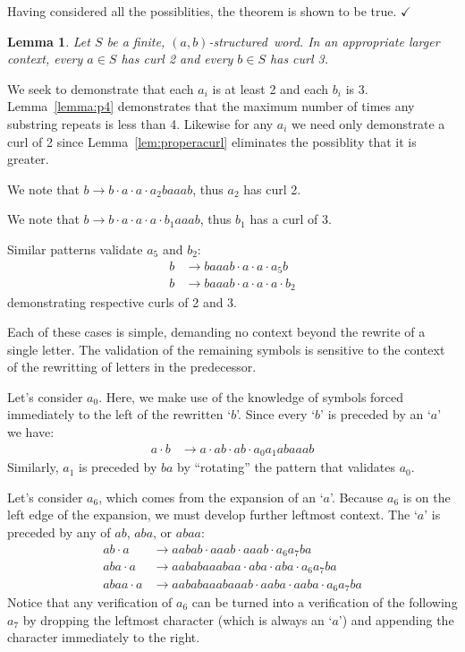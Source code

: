 \documentclass[11pt]{article}
\newcounter{thm}
\newtheorem{lemma}[thm]{Lemma}
\def\QED{$\checkmark$}
\def\ni{\noindent}
\def\ab{$(a,b)$}
\def\abs{\ab-structured}
\def\q#1{`$#1$'}
\def\Proof{\ni{\bf Proof:} }
\begin{document}
Having considered all the possiblities, the theorem is shown to be true.
\QED


\begin{lemma}\label{lem:abcurl}
Let $S$ be a finite, \abs\ word.  In an appropriate larger context, every $a\in S$ has curl 2 and every $b\in S$ has curl 3.
\end{lemma}
\Proof We seek to demonstrate that each $a_i$ is at least 2 and each $b_i$ is 3.
Lemma~\ref{lemma:p4} demonstrates that the maximum number of times any substring
repeats is less than 4.  Likewise for any $a_i$ we need only demonstrate a curl
of 2 since Lemma~\ref{lem:properacurl} eliminates the possiblity that it is greater.

\ni {Case $a_2$.} We note that $b\rightarrow b\cdot a\cdot a\cdot a_2baaab$, thus $a_2$ has curl 2.

\ni{Case $b_1$.}  We note that $b\rightarrow b\cdot a\cdot a\cdot a\cdot b_1aaab$, thus $b_1$ has a curl of 3.

\ni{Case $a_5$.} Similar patterns validate $a_5$ and $b_2$:
\begin{align*}
b&\rightarrow baaab\cdot a \cdot a \cdot a_5b\\
b&\rightarrow baaab\cdot a \cdot a \cdot a\cdot b_2
\end{align*}
\ni demonstrating respective curls of 2 and 3.

\ni Each of these cases is simple, demanding no context beyond the rewrite of a single letter. The validation of the remaining symbols is sensitive to the context of the rewritting of letters in the predecessor.

Let's consider $a_0$.  Here, we make use of the knowledge of symbols forced immediately
to the left of the rewritten \q{b}.  Since every \q{b} is preceded by an \q{a} we have:
\begin{align*}
a\cdot b&\rightarrow a\cdot ab\cdot ab\cdot a_0a_1abaaab
\end{align*}
Similarly, $a_1$ is preceded by $ba$ by ``rotating'' the pattern that
validates $a_0$.

Let's consider $a_6$, which comes from the expansion of an \q{a}. Because
$a_6$ is on the left edge of the expansion, we must develop further leftmost
context.  The \q{a} is preceded by any of $ab$, $aba$, or $abaa$:
\begin{align*}
ab\cdot a&\rightarrow aabab\cdot aaab\cdot aaab\cdot a_6a_7ba\\
aba\cdot a&\rightarrow aababaaabaa\cdot aba \cdot aba\cdot a_6a_7ba\\
abaa\cdot a&\rightarrow aababaaabaaab\cdot aaba\cdot aaba\cdot a_6a_7ba
\end{align*}
\ni Notice that any verification of $a_6$ can be turned into a verification
of the following $a_7$ by dropping the leftmost character (which is always
an \q{a}) and appending the character immediately to the right.  
\end{document}
